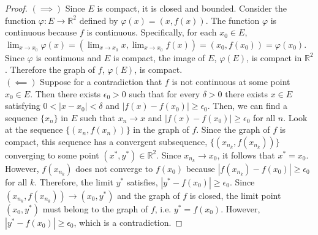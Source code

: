 \documentclass[11pt]{article}
\begin{document}
\begin{exercise}{6}
    \begin{proof}
        $(\implies)$ Since $E$ is compact, it is closed and bounded. Consider the function $\varphi: E \to \mathbb{R}^2$ defined by $\varphi(x) = (x, f(x))$. The function $\varphi$ is continuous because $f$ is continuous. Specifically, for each $x_0 \in E$, $\lim_{x \to x_0} \varphi(x) = \left( \lim_{x \to x_0} x, \lim_{x \to x_0} f(x) \right) = (x_0, f(x_0)) = \varphi(x_0)$. Since $\varphi$ is continuous and $E$ is compact, the image of $E$, $\varphi(E)$, is compact in $\mathbb{R}^2$. Therefore the graph of $f$, $\varphi(E)$, is compact. \\

        $(\impliedby)$ Suppose for a contradiction that $f$ is not continuous at some point $x_0 \in E$. Then there exists $\epsilon_0 > 0$ such that for every $\delta > 0$ there exists $x \in E$ satisfying $0 < |x - x_0| < \delta$ and $|f(x) - f(x_0)| \ge \epsilon_0$. Then, we can find a sequence $\{ x_n \}$ in $E$ such that $x_n \to x$ and $|f(x) - f(x_0)| \ge \epsilon_0$ for all $n$. Look at the sequence $\{ (x_n, f(x_n)) \}$ in the graph of $f$. Since the graph of $f$ is compact, this sequence has a convergent subsequence, $\{ (x_{n_k}, f(x_{n_k})) \}$ converging to some point $(x^*, y^*) \in \mathbb{R}^2$. Since $x_{n_k} \to x_0$, it follows that $x^* = x_0$. However, $f(x_{n_k})$ does not converge to $f(x_0)$ because $|f(x_{n_k}) - f(x_0)| \ge \epsilon_0$ for all $k$. Therefore, the limit $y^*$ satisfies, $|y^* - f(x_0)| \ge \epsilon_0$. Since $(x_{n_k}, f(x_{n_k})) \to (x_0, y^*)$ and the graph of $f$ is closed, the limit point $(x_0, y^*)$ must belong to the graph of $f$, i.e. $y^* = f(x_0)$. However, $|y^* - f(x_0)| \ge \epsilon_0$, which is a contradiction. 
    \end{proof}
\end{exercise}
\end{document}

